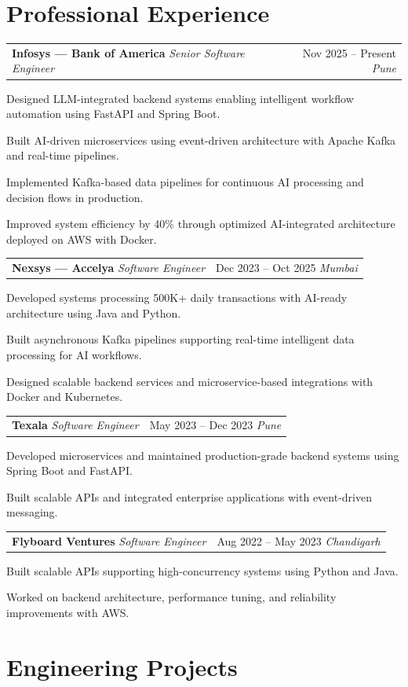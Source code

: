 \documentclass[10pt, letterpaper]{article}
\makeatletter
\newcommand{\resumeitem}[1]{\item\small{#1}}
\newcommand{\jobheading}[4]{%
  \noindent
  \begin{tabularx}{\textwidth}{@{}X r@{}}
    \textbf{\color{primary}#1} \textbar{} \textit{\small\color{subtle}#2} &
    \small\color{subtle}#3 \textbar{} \textit{\small #4}
  \end{tabularx}%
}
\makeatother
\begin{document}
\section{Professional Experience}

\jobheading{Infosys --- Bank of America}{Senior Software Engineer}{Nov 2025 -- Present}{Pune}

\begin{jobitems}
\resumeitem{Designed LLM-integrated backend systems enabling intelligent workflow automation using FastAPI and Spring Boot.}
\resumeitem{Built AI-driven microservices using event-driven architecture with Apache Kafka and real-time pipelines.}
\resumeitem{Implemented Kafka-based data pipelines for continuous AI processing and decision flows in production.}
\resumeitem{Improved system efficiency by 40\% through optimized AI-integrated architecture deployed on AWS with Docker.}
\end{jobitems}

\jobheading{Nexsys --- Accelya}{Software Engineer}{Dec 2023 -- Oct 2025}{Mumbai}

\begin{jobitems}
\resumeitem{Developed systems processing 500K+ daily transactions with AI-ready architecture using Java and Python.}
\resumeitem{Built asynchronous Kafka pipelines supporting real-time intelligent data processing for AI workflows.}
\resumeitem{Designed scalable backend services and microservice-based integrations with Docker and Kubernetes.}
\end{jobitems}

\jobheading{Texala}{Software Engineer}{May 2023 -- Dec 2023}{Pune}

\begin{jobitems}
\resumeitem{Developed microservices and maintained production-grade backend systems using Spring Boot and FastAPI.}
\resumeitem{Built scalable APIs and integrated enterprise applications with event-driven messaging.}
\end{jobitems}

\jobheading{Flyboard Ventures}{Software Engineer}{Aug 2022 -- May 2023}{Chandigarh}

\begin{jobitems}
\resumeitem{Built scalable APIs supporting high-concurrency systems using Python and Java.}
\resumeitem{Worked on backend architecture, performance tuning, and reliability improvements with AWS.}
\end{jobitems}

\section{Engineering Projects}
\end{document}
